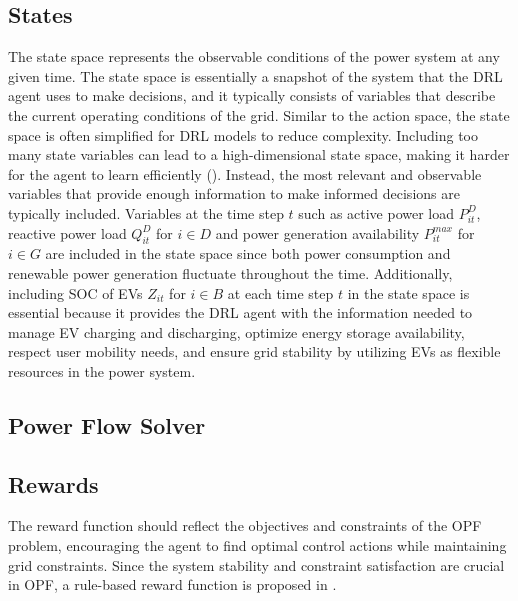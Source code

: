 \subsection{States}
The state space represents the observable conditions of the power system at any given time. The state space is essentially a snapshot of the system that the \gls{DRL} agent uses to make decisions, and it typically consists of variables that describe the current operating conditions of the grid. Similar to the action space, the state space is often simplified for \gls{DRL} models to reduce complexity. Including too many state variables can lead to a high-dimensional state space, making it harder for the agent to learn efficiently (\cite{wolgast2024learning}). Instead, the most relevant and observable variables that provide enough information to make informed decisions are typically included. Variables at the time step $t$ such as active power load $P_{it}^D$, reactive power load $Q_{it}^D$ for $i \in D$ and power generation availability $P_{it}^{max}$ for $i \in G$ are included in the state space since both power consumption and renewable power generation  fluctuate throughout the time. Additionally, including \gls{SOC} of \gls{EV}s $Z_{it}$ for $i \in B$ at each time step $t$ in the state space is essential because it provides the \gls{DRL} agent with the information needed to manage \gls{EV} charging and discharging, optimize energy storage availability, respect user mobility needs, and ensure grid stability by utilizing \gls{EV}s as flexible resources in the power system. 

\subsection{Power Flow Solver}

\subsection{Rewards}
The reward function should reflect the objectives and constraints of the \gls{OPF} problem, encouraging the agent to find optimal control actions while maintaining grid constraints. Since the system stability and constraint satisfaction are crucial in \gls{OPF}, a rule-based reward function is proposed in .
    


